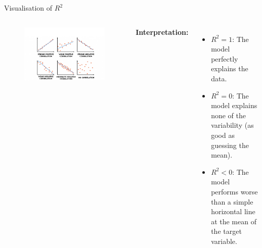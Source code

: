 \begin{frame}{Visualisation of $R^2$}
    \begin{columns}
            \begin{figure}
                \centering
                \includegraphics[width=\linewidth]{images/linear-regression/linear-regression-20.png}
            \end{figure}
        
            \textbf{Interpretation:}
            \begin{itemize}
                \item $R^2 = 1$: The model perfectly explains the data.
                \item $R^2 = 0$: The model explains none of the variability (as good as guessing the mean).
                \item $R^2 < 0$: The model performs worse than a simple horizontal line at the mean of the target variable.
            \end{itemize}
    \end{columns}
\end{frame}


